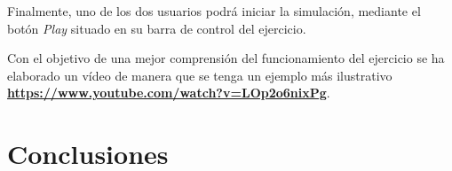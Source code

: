 \documentclass[a4paper, 12pt]{book}
\begin{document}
Finalmente, uno de los dos usuarios podrá iniciar la simulación, mediante el botón \emph{Play} situado en su barra de control del ejercicio.

Con el objetivo de una mejor comprensión del funcionamiento del ejercicio se ha elaborado un vídeo de manera que se tenga un ejemplo más ilustrativo \textbf{\url{https://www.youtube.com/watch?v=LOp2o6nixPg}}.














\cleardoublepage
\chapter{Conclusiones}
\label{chap:conclusiones}
\end{document}

